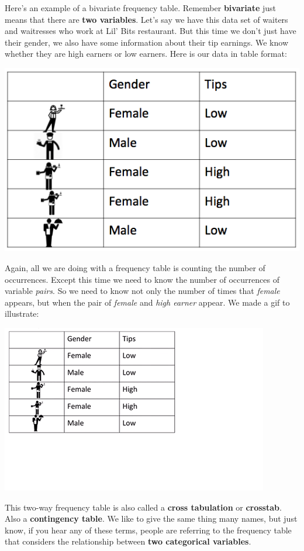 \documentclass[
]{book}
\begin{document}
Here's an example of a bivariate frequency table. Remember \textbf{bivariate} just means that there are \textbf{two variables}. Let's say we have this data set of waiters and waitresses who work at Lil' Bits restaurant. But this time we don't just have their gender, we also have some information about their tip earnings. We know whether they are high earners or low earners. Here is our data in table format:

\includegraphics{imgs/waiter_height_and_tip.png}

Again, all we are doing with a frequency table is counting the number of occurrences. Except this time we need to know the number of occurrences of variable \emph{pairs}. So we need to know not only the number of times that \emph{female} appears, but when the pair of \emph{female} and \emph{high earner} appear. We made a gif to illustrate:

\includegraphics{imgs/bivar_freq_table_gif.gif}

This two-way frequency table is also called a \textbf{cross tabulation} or \textbf{crosstab}. Also a \textbf{contingency table}. We like to give the same thing many names, but just know, if you hear any of these terms, people are referring to the frequency table that considers the relationship between \textbf{two categorical variables}.
\end{document}
